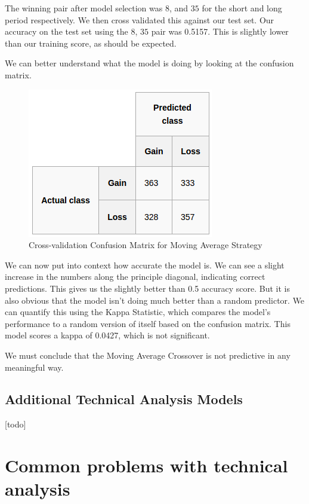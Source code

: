 \documentclass{report}
\begin{document}
The winning pair after model selection was $8$, and $35$ for the short and long period respectively. We then cross validated this against our test set. Our accuracy on the test set using the $8$, $35$ pair was 0.5157. This is slightly lower than our training score, as should be expected.

We can better understand what the model is doing by looking at the confusion matrix.

\begin{figure}[H]
	\caption{Cross-validation Confusion Matrix for Moving Average Strategy}
	\centerline{\includegraphics[scale=0.75]{vis/ma_confusion.png}}
	\label{fig:ma-confusion}
\end{figure}

We can now put into context how accurate the model is. We can see a slight increase in the numbers along the principle diagonal, indicating correct predictions. This gives us the slightly better than 0.5 accuracy score. But it is also obvious that the model isn't doing much better than a random predictor. We can quantify this using the Kappa Statistic, which compares the model's performance to a random version of itself based on the confusion matrix. This model scores a kappa of 0.0427, which is not significant. 

We must conclude that the Moving Average Crossover is not predictive in any meaningful way.

\subsection{Additional Technical Analysis Models}

[todo]

\section{Common problems with technical analysis}
\end{document}
